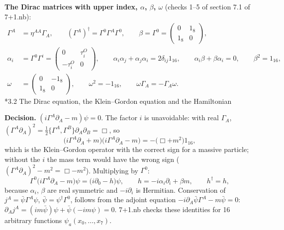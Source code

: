 \documentclass[10pt,a4paper]{article}
\makeatletter
\renewcommand\subsection{\@startsection{subsection}{2}{\z@}{-3.25ex\@plus -1ex \@minus -.2ex}{1.5ex \@plus .2ex}{\normalfont\large\bfseries\raggedright}}
\makeatother
\begin{document}
\textbf{The Dirac matrices with upper index, $\alpha$, $\beta$, $\omega$} (checks 1–5 of section 7.1 of 7+1.nb):
\begin{align*}
\Gamma^A&=\eta^{AA}\Gamma_A,\qquad (\Gamma^A)^\dagger=\Gamma^0\Gamma^A\Gamma^0,\qquad \beta=\Gamma^0=\begin{pmatrix}0&1_8\\1_8&0\end{pmatrix}, \\
\alpha_i&=\Gamma^0\Gamma^i=\begin{pmatrix}0&\tau^{O}_i\\-\tau^{O}_i&0\end{pmatrix},\qquad \alpha_i\alpha_j+\alpha_j\alpha_i=2\delta_{ij}1_{16},\qquad \alpha_i\beta+\beta\alpha_i=0,\qquad \beta^2=1_{16}, \\
\omega&=\begin{pmatrix}0&-1_8\\1_8&0\end{pmatrix},\qquad \omega^2=-1_{16},\qquad \omega\Gamma_A=-\Gamma_A\omega .
\end{align*}
\subsection*{3.2 The Dirac equation, the Klein–Gordon equation and the Hamiltonian}
\textbf{Decision.} $(i\Gamma^A\partial_A-m)\psi=0$. The factor $i$ is unavoidable: with real $\Gamma_A$, $(\Gamma^A\partial_A)^2=\tfrac12\lbrace\Gamma^A,\Gamma^B\rbrace\partial_A\partial_B=\Box$, so
\begin{equation*}
\big(i\Gamma^A\partial_A+m\big)\big(i\Gamma^A\partial_A-m\big)=-\big(\Box+m^2\big)1_{16},
\end{equation*}
which is the Klein–Gordon operator with the correct sign for a massive particle; without the $i$ the mass term would have the wrong sign ($(\Gamma^A\partial_A)^2-m^2=\Box-m^2$). Multiplying by $\Gamma^0$:
\begin{equation*}
\Gamma^0\big(i\Gamma^A\partial_A-m\big)\psi=\big(i\partial_0-h\big)\psi,\qquad h=-i\alpha_i\partial_i+\beta m,\qquad h^\dagger=h,
\end{equation*}
because $\alpha_i$, $\beta$ are real symmetric and $-i\partial_i$ is Hermitian. Conservation of $j^A=\bar\psi\Gamma^A\psi$, $\bar\psi=\psi^\dagger\Gamma^0$, follows from the adjoint equation $-i\partial_A\bar\psi\Gamma^A-m\bar\psi=0$: $\partial_Aj^A=(im\bar\psi)\psi+\bar\psi(-im\psi)=0$. 7+1.nb checks these identities for 16 arbitrary functions $\psi_a(x_0,\dots,x_7)$.
\end{document}
